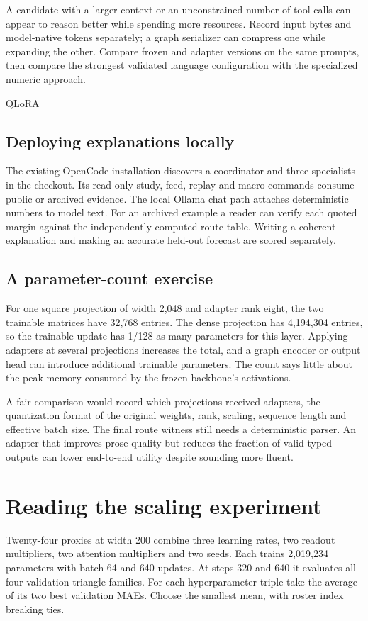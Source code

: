 \documentclass[11pt,oneside,openany]{book}
\begin{document}
A candidate with a larger context or an unconstrained number of tool calls can appear to reason better while spending more resources. Record input bytes and model-native tokens separately; a graph serializer can compress one while expanding the other. Compare frozen and adapter versions on the same prompts, then compare the strongest validated language configuration with the specialized numeric approach.

{\small\sffamily\href{https://arxiv.org/abs/2305.14314}{QLoRA}\par}
\section*{Deploying explanations locally}
The existing OpenCode installation discovers a coordinator and three specialists in the checkout. Its read-only study, feed, replay and macro commands consume public or archived evidence. The local Ollama chat path attaches deterministic numbers to model text. For an archived example a reader can verify each quoted margin against the independently computed route table. Writing a coherent explanation and making an accurate held-out forecast are scored separately.

\section*{A parameter-count exercise}
For one square projection of width 2,048 and adapter rank eight, the two trainable matrices have 32,768 entries. The dense projection has 4,194,304 entries, so the trainable update has 1/128 as many parameters for this layer. Applying adapters at several projections increases the total, and a graph encoder or output head can introduce additional trainable parameters. The count says little about the peak memory consumed by the frozen backbone's activations.

A fair comparison would record which projections received adapters, the quantization format of the original weights, rank, scaling, sequence length and effective batch size. The final route witness still needs a deterministic parser. An adapter that improves prose quality but reduces the fraction of valid typed outputs can lower end-to-end utility despite sounding more fluent.

\chapter{Reading the scaling experiment}
Twenty-four proxies at width 200 combine three learning rates, two readout multipliers, two attention multipliers and two seeds. Each trains 2,019,234 parameters with batch 64 and 640 updates. At steps 320 and 640 it evaluates all four validation triangle families. For each hyperparameter triple take the average of its two best validation MAEs. Choose the smallest mean, with roster index breaking ties.
\end{document}
